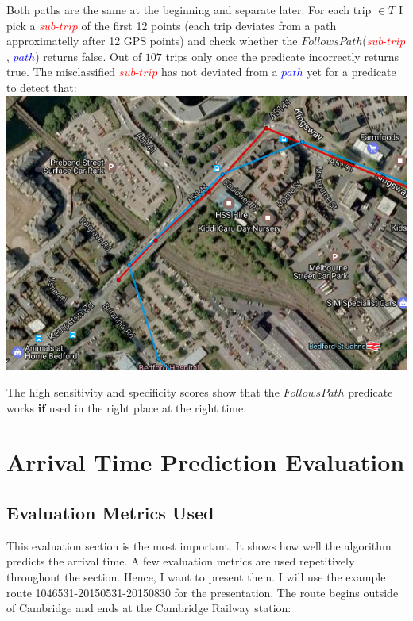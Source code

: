 \documentclass[12pt,a4paper,oneside,openright]{report}
\begin{document}
Both paths are the same at the beginning and separate later. For each
trip $\in T$ I pick a \textcolor{red}{$sub$-$trip$} of the first 12
points (each trip deviates from a path approximatelly after 12 GPS
points) and check whether the
$FollowsPath$(\textcolor{red}{$sub$-$trip$}, \textcolor{blue}{$path$}) 
returns false. Out of $107$ trips only once the predicate incorrectly returns
true. The misclassified \textcolor{red}{$sub$-$trip$} has not deviated from a
\textcolor{blue}{$path$} yet for a predicate to detect that: \\

\includegraphics[scale = 0.6]{figs/misclassified_trip.png}

The high sensitivity and specificity scores show that the $FollowsPath$
predicate works \textbf{if} used in the right place at the right time.

\newpage

\section{Arrival Time Prediction Evaluation}

\subsection{Evaluation Metrics Used}

This evaluation section is the most important. It shows how well the algorithm
predicts the arrival time. A few evaluation metrics are used repetitively
throughout the section. Hence, I want to present them. I will use the example route
1046531-20150531-20150830 for the presentation. The route begins outside of Cambridge
and ends at the Cambridge Railway station: \\
\end{document}
